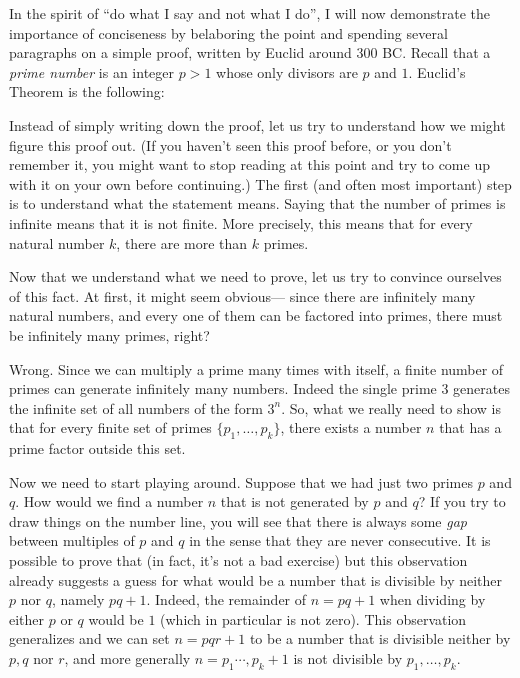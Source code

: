 In the spirit of ``do what I say and not what I do'', I will now
demonstrate the importance of conciseness by belaboring the point and
spending several paragraphs on a simple proof, written by Euclid around
300 BC. Recall that a \emph{prime number} is an integer \(p>1\) whose
only divisors are \(p\) and \(1\). Euclid's Theorem is the following:

\hypertarget{infprimesthm}{}

Instead of simply writing down the proof, let us try to understand how
we might figure this proof out. (If you haven't seen this proof before,
or you don't remember it, you might want to stop reading at this point
and try to come up with it on your own before continuing.) The first
(and often most important) step is to understand what the statement
means. Saying that the number of primes is infinite means that it is not
finite. More precisely, this means that for every natural number \(k\),
there are more than \(k\) primes.

Now that we understand what we need to prove, let us try to convince
ourselves of this fact. At first, it might seem obvious--- since there
are infinitely many natural numbers, and every one of them can be
factored into primes, there must be infinitely many primes, right?

Wrong. Since we can multiply a prime many times with itself, a finite
number of primes can generate infinitely many numbers. Indeed the single
prime \(3\) generates the infinite set of all numbers of the form
\(3^n\). So, what we really need to show is that for every finite set of
primes \(\{ p_1,\ldots,p_k\}\), there exists a number \(n\) that has a
prime factor outside this set.

Now we need to start playing around. Suppose that we had just two primes
\(p\) and \(q\). How would we find a number \(n\) that is not generated
by \(p\) and \(q\)? If you try to draw things on the number line, you
will see that there is always some \emph{gap} between multiples of \(p\)
and \(q\) in the sense that they are never consecutive. It is possible
to prove that (in fact, it's not a bad exercise) but this observation
already suggests a guess for what would be a number that is divisible by
neither \(p\) nor \(q\), namely \(pq+1\). Indeed, the remainder of
\(n=pq+1\) when dividing by either \(p\) or \(q\) would be \(1\) (which
in particular is not zero). This observation generalizes and we can set
\(n=pqr+1\) to be a number that is divisible neither by \(p,q\) nor
\(r\), and more generally \(n=p_1\cdots, p_k +1\) is not divisible by
\(p_1,\ldots,p_k\).

